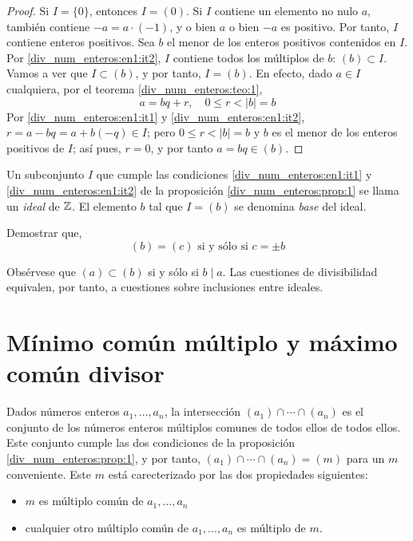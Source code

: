 \begin{proof}
    Si $I=\{0\}$, entonces $I=(0)$. Si $I$ contiene un elemento no nulo $a$, también contiene $-a=a\cdot(-1)$, y o bien $a$ o bien $-a$ es positivo. Por tanto, $I$ contiene enteros positivos. Sea $b$ el menor de los enteros positivos contenidos en $I$. Por \ref{div_num_enteros:en1:it2}, $I$ contiene todos los múltiplos de $b$: $(b)\subset I$. Vamos a ver que $I\subset (b)$, y por tanto, $I=(b)$. En efecto, dado $a\in I$ cualquiera, por el teorema \ref{div_num_enteros:teo:1},
    $$a=bq+r, \quad 0\leq r<|b|=b$$
    Por \ref{div_num_enteros:en1:it1} y \ref{div_num_enteros:en1:it2}, $r=a-bq=a+b(-q)\in I$; pero $0\leq r<|b|=b$ y $b$ es el menor de los enteros positivos de $I$; así pues, $r=0$, y por tanto $a=bq\in (b)$.
\end{proof}

Un subconjunto $I$ que cumple las condiciones \ref{div_num_enteros:en1:it1} y \ref{div_num_enteros:en1:it2} de la proposición \ref{div_num_enteros:prop:1} se llama un {\it ideal} de $\mathbb{Z}$. El elemento $b$ tal que $I=(b)$ se denomina {\it base} del ideal.

\begin{ejer}
    Demostrar que,
    $$(b)=(c)\text{ si y sólo si }c=\pm b$$
\end{ejer}

Obsérvese que $(a)\subset (b)$ si y sólo si $b\mid a$. Las cuestiones de divisibilidad equivalen, por tanto, a cuestiones sobre inclusiones entre ideales.

\section{Mínimo común múltiplo y máximo común divisor}

Dados números enteros $a_1,\dots,a_n$, la intersección $(a_1)\cap\cdots\cap(a_n)$ es el conjunto de los números enteros múltiplos comunes de todos ellos de todos ellos. Este conjunto cumple las dos condiciones de la proposición \ref{div_num_enteros:prop:1}, y por tanto, $(a_1)\cap\cdots\cap(a_n)=(m)$ para un $m$ conveniente. Este $m$ está carecterizado por las dos propiedades siguientes:

\begin{itemize}
    \item $m$ es múltiplo común de $a_1,\dots,a_n$
    \item cualquier otro múltiplo común de $a_1,\dots,a_n$ es múltiplo de $m$.
\end{itemize}

